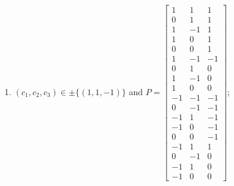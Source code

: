 \begin{enumerate}
\item[(d47)\,\newitem] $(c_1,c_2,c_3)\in \pm\{(1,1,-1)\}$ and $P=\begin{bmatrix}1&1&1\\0&1&1\\1&-1&1\\1&0&1\\0&0&1\\1&-1&-1\\0&1&0\\1&-1&0\\1&0&0\\-1&-1&-1\\0&-1&-1\\-1&1&-1\\-1&0&-1\\0&0&-1\\-1&1&1\\0&-1&0\\-1&1&0\\-1&0&0\end{bmatrix}$;
\end{enumerate}
